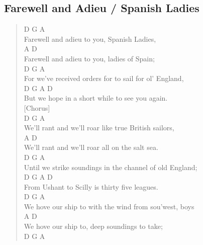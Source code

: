 \documentclass[11pt]{article}
\begin{document}
\subsection{Farewell and Adieu / Spanish Ladies}
\label{sec:org251de51}
\begin{verse}
D                     G            A\\
Farewell and adieu to you, Spanish Ladies,\\
\hspace*{4em}A                                D\\
Farewell and adieu to you, ladies of Spain;\\
\hspace*{4em}D                            G            A\\
For we've received orders for to sail for ol' England,\\
\hspace*{7em}D         G              A        D\\
But we hope in a short while to see you again.\\
\vspace*{1em}
[Chorus]\\
D                              G            A\\
We'll rant and we'll roar like true British sailors,\\
\hspace*{6em}A                                   D\\
We'll rant and we'll roar all on the salt sea.\\
D                                G              A\\
Until we strike soundings in the channel of old England;\\
\hspace*{5em}D         G         A           D\\
From Ushant to Scilly is thirty five leagues.\\
\vspace*{1em}
\hspace*{3em}D                         G             A\\
We hove our ship to with the wind from sou'west, boys\\
\hspace*{3em}A                                       D\\
We hove our ship to, deep soundings to take;\\
\hspace*{6em}D                          G           A\\

\end{verse}
\end{document}
